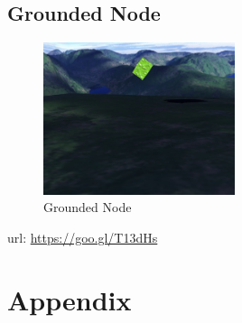 \documentclass[12pt]{article}
\begin{document}
\subsection{Grounded Node}
\begin{figure}[H]
	\centering
	\includegraphics[width=0.5\textwidth]{groundedNode}
	\caption[]%
	{{\small Grounded Node}}    
\end{figure}
url: \url{https://goo.gl/T13dHs}




\newpage
\section{Appendix}

\end{document}
